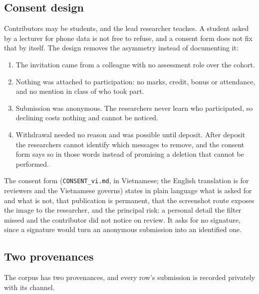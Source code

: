 \subsection*{Consent design}
Contributors may be students, and the lead researcher teaches. A student asked by a lecturer
for phone data is not free to refuse, and a consent form does not fix that by itself. The
design removes the asymmetry instead of documenting it:
\begin{enumerate}[leftmargin=1.6em,itemsep=1pt,topsep=2pt]
  \item The invitation came from a colleague with no assessment role over the cohort.
  \item Nothing was attached to participation: no marks, credit, bonus or attendance, and no
  mention in class of who took part.
  \item Submission was anonymous. The researchers never learn who participated, so declining
  costs nothing and cannot be noticed.
  \item Withdrawal needed no reason and was possible until deposit. After deposit the
  researchers cannot identify which messages to remove, and the consent form says so in those
  words instead of promising a deletion that cannot be performed.
\end{enumerate}
The consent form (\texttt{CONSENT\_vi.md}, in Vietnamese; the English translation is for
reviewers and the Vietnamese governs) states in plain language what is asked for and what is
not, that publication is permanent, that the screenshot route exposes the image to the
researcher, and the principal risk: a personal detail the filter missed and the contributor did
not notice on review. It asks for no signature, since a signature would turn an anonymous
submission into an identified one.

\subsection*{Two provenances}
The corpus has two provenances, and every row's submission is recorded privately with its channel.

